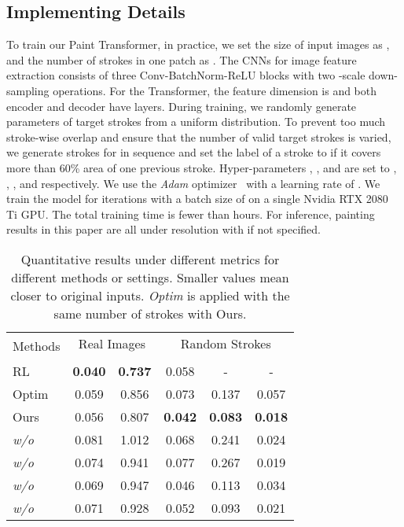 \documentclass[10pt,twocolumn,letterpaper]{article}
\begin{document}
\subsection{Implementing Details}
To train our Paint Transformer, in practice, we set the size of input images  as , and the number of strokes  in one patch as .
The CNNs for image feature extraction consists of three Conv-BatchNorm-ReLU blocks with two -scale down-sampling operations.
For the Transformer, the feature dimension is  and both encoder and decoder have  layers.
During training, we randomly generate parameters of  target strokes from a uniform distribution.
To prevent too much stroke-wise overlap and ensure that the number of valid target strokes is varied, we generate strokes for  in sequence and set the label of a stroke to  if it covers more than 60\% area of one previous stroke.
Hyper-parameters , ,  and  are set to , , , and  respectively.
We use the \textit{Adam} optimizer~\cite{kingma2014adam} with a learning rate of . 
We train the model for  iterations with a batch size of  on a single Nvidia RTX 2080 Ti GPU. The total training time is fewer than  hours.
For inference, painting results in this paper are all under  resolution with  if not specified.

\begin{table}[!t]
\centering
    \begin{tabular}{lccccc}
        \toprule
        \multirow{2}{1.5cm}{Methods} & \multicolumn{2}{c}{Real Images} & \multicolumn{3}{c}{Random Strokes} \\
        \cline{2-6}
        &  &  &  &  &  \\
        \midrule
        RL~\cite{huang2019learning} & \textbf{0.040} & \textbf{0.737} & 0.058 & - & - \\
        Optim~\cite{zou2020stylized} & 0.059 & 0.856 & 0.073 & 0.137 & 0.057 \\
        Ours & 0.056 & 0.807 & \textbf{0.042} & \textbf{0.083} & \textbf{0.018} \\
        \hline
        \textit{w/o}  & 0.081 & 1.012 & 0.068 & 0.241 & 0.024 \\
        \textit{w/o}  & 0.074 & 0.941 & 0.077 & 0.267 & 0.019 \\
        \textit{w/o}  & 0.069 & 0.947 & 0.046 & 0.113 & 0.034 \\
        \textit{w/o}  & 0.071 & 0.928 & 0.052 & 0.093 & 0.021 \\
        \bottomrule
    \end{tabular}
    \vspace{0.3cm}
    \caption{Quantitative results under different metrics for different methods or settings. Smaller values mean closer to original inputs. \emph{Optim} is applied with the same number of strokes with Ours.}
    \vspace{-0.5cm}
    \label{table:quantitative}
\end{table}
\end{document}
